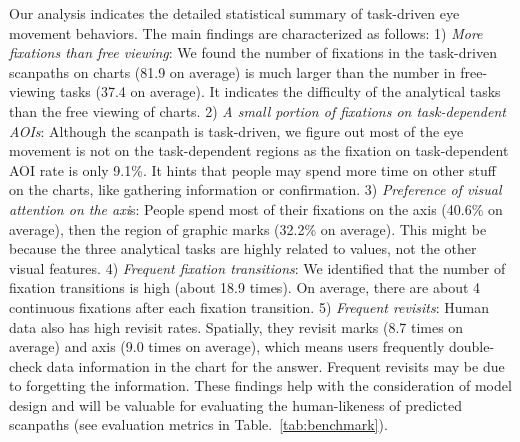 Our analysis indicates the detailed statistical summary of task-driven eye movement behaviors. 
The main findings are characterized as follows:
1) \textit{More fixations than free viewing}: We found the number of fixations in the task-driven scanpaths on charts (81.9 on average) is much larger than the number in free-viewing tasks (37.4 on average). It indicates the difficulty of the analytical tasks than the free viewing of charts.
2) \textit{A small portion of fixations on task-dependent AOIs}: Although the scanpath is task-driven, we figure out most of the eye movement is not on the task-dependent regions as the fixation on task-dependent AOI rate is only 9.1\%. It hints that people may spend more time on other stuff on the charts, like gathering information or confirmation.
3) \textit{Preference of visual attention on the axi}s: People spend most of their fixations on the axis (40.6\% on average), then the region of graphic marks (32.2\% on average). This might be because the three analytical tasks are highly related to values, not the other visual features. 
4) \textit{Frequent fixation transitions}: We identified that the number of fixation transitions is high (about 18.9 times). On average, there are about 4 continuous fixations after each fixation transition.
5) \textit{Frequent revisits}: Human data also has high revisit rates. Spatially, they revisit marks (8.7 times on average) and axis (9.0 times on average), which means users frequently double-check data information in the chart for the answer. Frequent revisits may be due to forgetting the information.
These findings help with the consideration of model design and will be valuable for evaluating the human-likeness of predicted scanpaths (see evaluation metrics in Table.~\ref{tab:benchmark}).


% 

